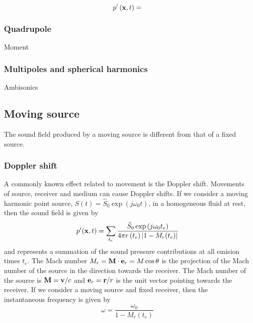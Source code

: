 \begin{equation}
 p' \left(\mathbf{x}, t\right) =
\end{equation}


\subsubsection*{Quadrupole}

Moment

\subsubsection*{Multipoles and spherical harmonics}



Ambisonics


\subsection{Moving source}
The sound field produced by a moving source is different from that of a fixed source.

\subsubsection{Doppler shift}
A commonly known effect related to movement is the Doppler shift.
Movements of source, receiver and medium can cause
Doppler shifts. If we consider a moving harmonic point source, $S(t) = \hat{S}_0
\exp{\left(j\omega_0 t\right)} $, in a homogeneous fluid at rest, then the sound
field is given by
\begin{equation}
  p'(\mathbf{x},t) = \sum_{t_e} \frac{\hat{S}_0 \exp{\left(j \omega_0 t_e\right)}}{4\pi r \left(t_e\right) \lvert1-M_r (t_e)\rvert}
\end{equation}
and represents a summation of the sound pressure contributions at all emision
times $t_e$. The Mach number $M_r = \mathbf{M} \cdot \mathbf{e}_r = M \cos{\theta}$ is
the projection of the Mach number of the source in the direction towards the
receiver. The Mach number of the source is $\mathbf{M}=\mathbf{v}/c$ and
$\mathbf{e}_r=\mathbf{r}/r$ is the unit vector pointing towards the receiver.
If we consider a moving source and fixed receiver, then the instantaneous
frequency is given by
\begin{equation}
  \omega = \frac{\omega_0}{1 - M_r(t_e)}
\end{equation}

